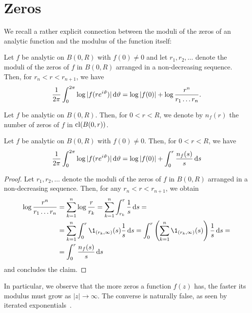 \chapter{Zeros}
\label{ch:zeros}

We recall a rather explicit connection between the moduli of the zeros of an analytic function and the modulus of the function itself:

\begin{theorem} \label{thm:jensen}
    Let $f$ be analytic on $B(0, R)$ with $f(0) \neq 0$ and let $r_1, r_2, \hdots$ denote the moduli of the zeros of $f$ in $B(0, R)$ arranged in a non-decreasing sequence. Then, for $r_n < r < r_{n+1}$, we have
    $$ \frac{1}{2 \pi} \int_0^{2\pi} \log \vert f(r e^{i \vartheta}) \vert \mathop{}\!\mathrm{d} \vartheta = \log \vert f(0) \vert + \log \frac{r^n}{r_1 \hdots r_n}. $$
\end{theorem}

\begin{definition}
    Let $f$ be analytic on $B(0, R)$. Then, for $0 < r < R$, we denote by $n_f(r)$ the number of zeros of $f$ in $\operatorname{cl}(B(0,r))$.
\end{definition}

\begin{corollary}
    Let $f$ be analytic on $B(0, R)$ with $f(0) \neq 0$. Then, for $0 < r < R$, we have
    $$ \frac{1}{2 \pi} \int_0^{2\pi} \log \vert f(re^{i \vartheta}) \vert \mathop{}\!\mathrm{d} \vartheta = \log \vert f(0) \vert + \int_0^r \frac{n_f(s)}{s} \mathop{}\!\mathrm{d} s $$
\end{corollary}

\begin{proof}
    Let $r_1, r_2, \hdots$ denote the moduli of the zeros of $f$ in $B(0, R)$ arranged in a non-decreasing sequence. Then, for any $r_n < r < r_{n+1}$, we obtain
    \begin{align*}
        \log \frac{r^n}{r_1 \hdots r_n} &= \sum_{k=1}^n \log \frac{r}{r_k} = \sum_{k=1}^n \int_{r_k}^r \frac{1}{s} \diff s = \\
        &= \sum_{k=1}^n \int_0^r \1_{(r_k, \infty)}(s) \frac{1}{s} \diff s = \int_0^r \left( \sum_{k=1}^n \1_{(r_k, \infty)}(s) \right) \frac{1}{s} \diff s = \\
        &= \int_0^r \frac{n_f(s)}{s} \diff s
    \end{align*}
    and  concludes the claim.
\end{proof}

In particular, we observe that the more zeros a function $f(z)$ has, the faster its modulus must grow as $\vert z \vert \to \infty$. The converse is naturally false, as seen by iterated exponentials~\cite{segal-complex-analysis}.

